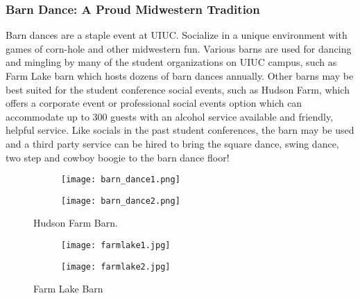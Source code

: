 \subsubsection{Barn Dance: A Proud Midwestern Tradition}
Barn dances are a staple event at UIUC. Socialize in a unique environment with games of corn-hole and other midwestern fun. Various barns are used for dancing and mingling by many of the student organizations on UIUC campus, such as Farm Lake barn which hosts dozens of barn dances annually. Other barns may be best suited for the student conference social events, such as Hudson Farm, which offers a corporate event or professional social events option which can accommodate up to 300 guests with an alcohol service available and friendly, helpful service. Like socials in the past student conferences, the barn may be used and a third party service can be hired to bring the square dance, swing dance, two step and cowboy boogie to the barn dance floor! 
\vspace{0.5cm}\newline
\begin{figure}[H]
	\centering
	\begin{subfigure}{0.4\textwidth}
		\centering
		\texttt{[image: barn\_dance1.png]}
	\end{subfigure}%
	\begin{subfigure}{0.4\textwidth}
		\centering
		\texttt{[image: barn\_dance2.png]}
	\end{subfigure}	
	\caption{Hudson Farm Barn.}	
\end{figure} 
\begin{figure}[H]
	\centering
	\begin{subfigure}{0.4\textwidth}
		\centering
		\texttt{[image: farmlake1.jpg]}
	\end{subfigure}%
	\begin{subfigure}{0.4\textwidth}
		\centering
		\texttt{[image: farmlake2.jpg]}
	\end{subfigure}	
	\caption{Farm Lake Barn}	
\end{figure} 

